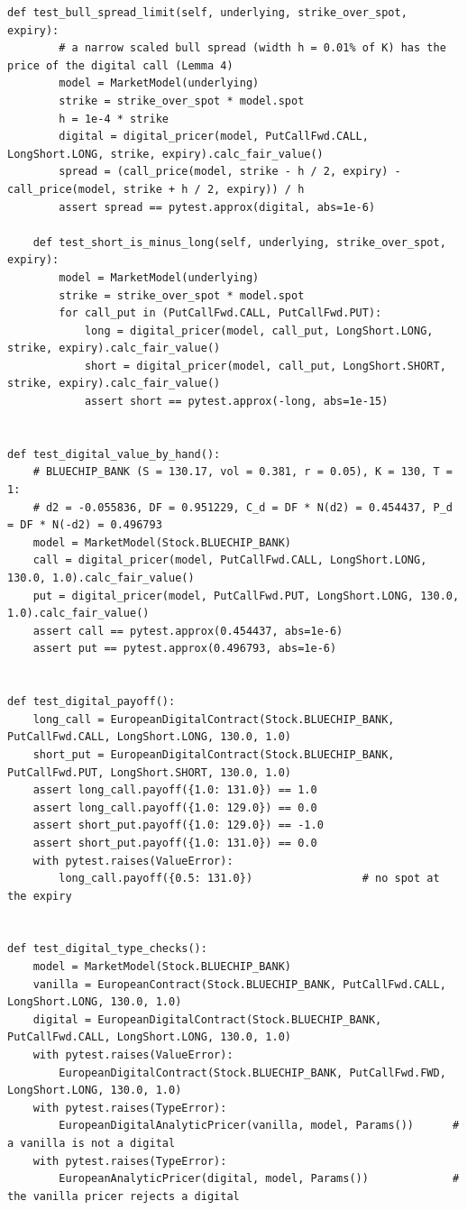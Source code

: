 \documentclass[11pt,a4paper]{article}
\begin{document}
\begin{lstlisting}[style=pysmall]
    def test_bull_spread_limit(self, underlying, strike_over_spot, expiry):
        # a narrow scaled bull spread (width h = 0.01% of K) has the price of the digital call (Lemma 4)
        model = MarketModel(underlying)
        strike = strike_over_spot * model.spot
        h = 1e-4 * strike
        digital = digital_pricer(model, PutCallFwd.CALL, LongShort.LONG, strike, expiry).calc_fair_value()
        spread = (call_price(model, strike - h / 2, expiry) - call_price(model, strike + h / 2, expiry)) / h
        assert spread == pytest.approx(digital, abs=1e-6)

    def test_short_is_minus_long(self, underlying, strike_over_spot, expiry):
        model = MarketModel(underlying)
        strike = strike_over_spot * model.spot
        for call_put in (PutCallFwd.CALL, PutCallFwd.PUT):
            long = digital_pricer(model, call_put, LongShort.LONG, strike, expiry).calc_fair_value()
            short = digital_pricer(model, call_put, LongShort.SHORT, strike, expiry).calc_fair_value()
            assert short == pytest.approx(-long, abs=1e-15)


def test_digital_value_by_hand():
    # BLUECHIP_BANK (S = 130.17, vol = 0.381, r = 0.05), K = 130, T = 1:
    # d2 = -0.055836, DF = 0.951229, C_d = DF * N(d2) = 0.454437, P_d = DF * N(-d2) = 0.496793
    model = MarketModel(Stock.BLUECHIP_BANK)
    call = digital_pricer(model, PutCallFwd.CALL, LongShort.LONG, 130.0, 1.0).calc_fair_value()
    put = digital_pricer(model, PutCallFwd.PUT, LongShort.LONG, 130.0, 1.0).calc_fair_value()
    assert call == pytest.approx(0.454437, abs=1e-6)
    assert put == pytest.approx(0.496793, abs=1e-6)


def test_digital_payoff():
    long_call = EuropeanDigitalContract(Stock.BLUECHIP_BANK, PutCallFwd.CALL, LongShort.LONG, 130.0, 1.0)
    short_put = EuropeanDigitalContract(Stock.BLUECHIP_BANK, PutCallFwd.PUT, LongShort.SHORT, 130.0, 1.0)
    assert long_call.payoff({1.0: 131.0}) == 1.0
    assert long_call.payoff({1.0: 129.0}) == 0.0
    assert short_put.payoff({1.0: 129.0}) == -1.0
    assert short_put.payoff({1.0: 131.0}) == 0.0
    with pytest.raises(ValueError):
        long_call.payoff({0.5: 131.0})                 # no spot at the expiry


def test_digital_type_checks():
    model = MarketModel(Stock.BLUECHIP_BANK)
    vanilla = EuropeanContract(Stock.BLUECHIP_BANK, PutCallFwd.CALL, LongShort.LONG, 130.0, 1.0)
    digital = EuropeanDigitalContract(Stock.BLUECHIP_BANK, PutCallFwd.CALL, LongShort.LONG, 130.0, 1.0)
    with pytest.raises(ValueError):
        EuropeanDigitalContract(Stock.BLUECHIP_BANK, PutCallFwd.FWD, LongShort.LONG, 130.0, 1.0)
    with pytest.raises(TypeError):
        EuropeanDigitalAnalyticPricer(vanilla, model, Params())      # a vanilla is not a digital
    with pytest.raises(TypeError):
        EuropeanAnalyticPricer(digital, model, Params())             # the vanilla pricer rejects a digital



\end{lstlisting}
\end{document}

